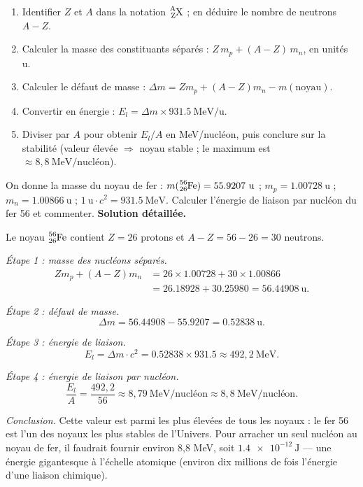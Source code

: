 \documentclass[11pt]{article}
\begin{document}
\begin{methode}
\begin{enumerate}
\item Identifier $Z$ et $A$ dans la notation $\ce{^{A}_{Z}X}$ ; en déduire le nombre de neutrons $A - Z$.
\item Calculer la masse des constituants séparés : $Z\, m_p + (A-Z)\, m_n$, en unités u.
\item Calculer le défaut de masse : $\Delta m = Z m_p + (A-Z) m_n - m(\text{noyau})$.
\item Convertir en énergie : $E_l = \Delta m \times \num{931,5}\ \text{MeV/u}$.
\item Diviser par $A$ pour obtenir $E_l/A$ en MeV/nucléon, puis conclure sur la stabilité (valeur élevée $\Rightarrow$ noyau stable ; le maximum est $\approx 8,8\ \text{MeV/nucléon}$).
\end{enumerate}
\end{methode}

\begin{exoresolu}
On donne la masse du noyau de fer : $m(\ce{^{56}_{26}Fe}) = \num{55,9207}\ \text{u}$ ; $m_p = \num{1,00728}\ \text{u}$ ; $m_n = \num{1,00866}\ \text{u}$ ; $1\ \text{u}\cdot c^2 = \num{931,5}\ \text{MeV}$. Calculer l'énergie de liaison par nucléon du fer 56 et commenter.
\tcblower
\textbf{Solution détaillée.}

Le noyau $\ce{^{56}_{26}Fe}$ contient $Z = 26$ protons et $A - Z = 56 - 26 = 30$ neutrons.

\emph{Étape 1 : masse des nucléons séparés.}
\begin{align*}
Z m_p + (A-Z) m_n &= 26 \times \num{1,00728} + 30 \times \num{1,00866} \\
&= \num{26,18928} + \num{30,25980} = \num{56,44908}\ \text{u}.
\end{align*}

\emph{Étape 2 : défaut de masse.}
\[ \Delta m = \num{56,44908} - \num{55,9207} = \num{0,52838}\ \text{u}. \]

\emph{Étape 3 : énergie de liaison.}
\[ E_l = \Delta m \cdot c^2 = \num{0,52838} \times \num{931,5} \approx 492,2\ \text{MeV}. \]

\emph{Étape 4 : énergie de liaison par nucléon.}
\[ \frac{E_l}{A} = \frac{492,2}{56} \approx 8,79\ \text{MeV/nucléon} \approx 8,8\ \text{MeV/nucléon}. \]

\emph{Conclusion.} Cette valeur est parmi les plus élevées de tous les noyaux : le fer 56 est l'un des noyaux les plus stables de l'Univers. Pour arracher un seul nucléon au noyau de fer, il faudrait fournir environ 8,8 MeV, soit $\num{1,4e-12}\ \text{J}$ — une énergie gigantesque à l'échelle atomique (environ dix millions de fois l'énergie d'une liaison chimique).
\end{exoresolu}
\end{document}

